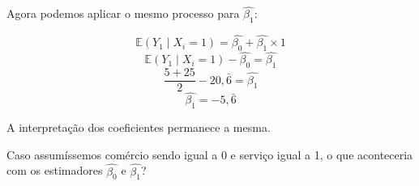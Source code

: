 \documentclass[]{ufpe-exercises}
\begin{document}
\begin{questions}
\begin{parts}
\begin{solution}
			Agora podemos aplicar o mesmo processo para \(\hat{\beta_1}\):

			\[\mathbb{E}(Y_1 \mid X_i = 1) = \hat{\beta_0} + \hat{\beta_1} \times 1\]
			\[\mathbb{E}(Y_1 \mid X_i = 1) - \hat{\beta_0} = \hat{\beta_1} \]
			\[\frac{5 + 25}{2} - 20,\bar{6} = \hat{\beta_1} \]
			\[\hat{\beta_1} = -5,\bar{6}\]

			A interpretação dos coeficientes permanece a mesma.

			\begin{tcolorbox}[colback=red!5!white,colframe=red!75!black,title=Atenção]
				Caso assumíssemos comércio sendo igual a 0 e serviço igual a 1, o que aconteceria com os estimadores \(\hat{\beta_0}\) e \(\hat{\beta_1}\)?
			\end{tcolorbox}

		\end{solution}
	\end{parts}

\end{questions}
\end{document}
